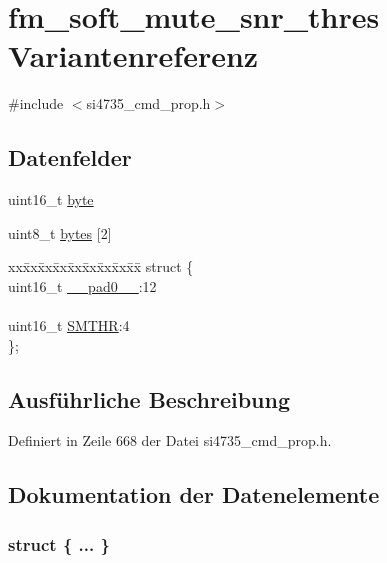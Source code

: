 \hypertarget{unionfm__soft__mute__snr__thres}{}\section{fm\+\_\+soft\+\_\+mute\+\_\+snr\+\_\+thres Variantenreferenz}
\label{unionfm__soft__mute__snr__thres}


{\ttfamily \#include $<$si4735\+\_\+cmd\+\_\+prop.\+h$>$}

\subsection*{Datenfelder}
\begin{DoxyCompactItemize}
\item 
uint16\+\_\+t \hyperlink{unionfm__soft__mute__snr__thres_ab0549c1b5ea980a02e7eab77e21fea49}{byte}
\item 
uint8\+\_\+t \hyperlink{unionfm__soft__mute__snr__thres_a46e4c05d20a047ec169f60d3167e912e}{bytes} \mbox{[}2\mbox{]}
\item 
\begin{tabbing}
xx\=xx\=xx\=xx\=xx\=xx\=xx\=xx\=xx\=\kill
struct \{\\
\>uint16\_t \hyperlink{unionfm__soft__mute__snr__thres_a77132c2c26a75f5b8751b235cda23828}{\_\_pad0\_\_}:12\\
\>\\
\>uint16\_t \hyperlink{unionfm__soft__mute__snr__thres_a843deda9d37a8dde2d92e9b98cc5a817}{SMTHR}:4\\
\}; \\

\end{tabbing}\end{DoxyCompactItemize}


\subsection{Ausführliche Beschreibung}


Definiert in Zeile 668 der Datei si4735\+\_\+cmd\+\_\+prop.\+h.



\subsection{Dokumentation der Datenelemente}
\hypertarget{unionfm__soft__mute__snr__thres_acf8b764381434d4031b40193de73f6d0}{}\subsubsection[{"@79}]{\setlength{\rightskip}{0pt plus 5cm}struct \{ ... \} }\label{unionfm__soft__mute__snr__thres_acf8b764381434d4031b40193de73f6d0}
\hypertarget{unionfm__soft__mute__snr__thres_a77132c2c26a75f5b8751b235cda23828}{}
